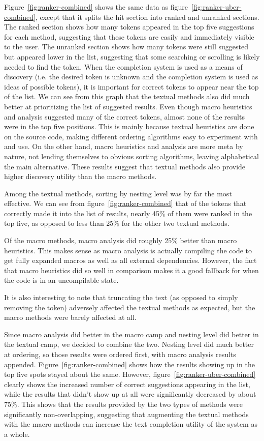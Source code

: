 \documentclass[ms,electronic,twosidetoc,letterpaper,chaptercenter,parttop,lol,lof,lot]{byumsphd}
\begin{document}
Figure~\ref{fig:ranker-combined} shows the same data as figure~\ref{fig:ranker-uber-combined}, except that it splits the hit section into ranked and unranked sections.
The ranked section shows how many tokens appeared in the top five suggestions for each method, suggesting that these tokens are easily and immediately visible to the user.
The unranked section shows how many tokens were still suggested but appeared lower in the list, suggesting that some searching or scrolling is likely needed to find the token.
When the completion system is used as a means of discovery (i.e. the desired token is unknown and the completion system is used as ideas of possible tokens), it is important for correct tokens to appear near the top of the list.
We can see from this graph that the textual methods also did much better at prioritizing the list of suggested results.
Even though macro heuristics and analysis suggested many of the correct tokens, almost none of the results were in the top five positions.
This is mainly because textual heuristics are done on the source code, making different ordering algorithms easy to experiment with and use.
On the other hand, macro heuristics and analysis are more meta by nature, not lending themselves to obvious sorting algorithms, leaving alphabetical the main alternative.
These results suggest that textual methods also provide higher discovery utility than the macro methods.

Among the textual methods, sorting by nesting level was by far the most effective.
We can see from figure~\ref{fig:ranker-combined} that of the tokens that correctly made it into the list of results, nearly 45\% of them were ranked in the top five, as opposed to less than 25\% for the other two textual methods.

Of the macro methods, macro analysis did roughly 25\% better than macro heuristics.
This makes sense as macro analysis is actually compiling the code to get fully expanded macros as well as all external dependencies.
However, the fact that macro heuristics did so well in comparison makes it a good fallback for when the code is in an uncompilable state.

It is also interesting to note that truncating the text (as opposed to simply removing the token) adversely affected the textual methods as expected, but the macro methods were barely affected at all.

Since macro analysis did better in the macro camp and nesting level did better in the textual camp, we decided to combine the two.
Nesting level did much better at ordering, so those results were ordered first, with macro analysis results appended.
Figure~\ref{fig:ranker-combined} shows how the results showing up in the top five spots stayed about the same.
However, figure~\ref{fig:ranker-uber-combined} clearly shows the increased number of correct suggestions appearing in the list, while the results that didn't show up at all were significantly decreased by about 75\%.
This shows that the results provided by the two types of methods were significantly non-overlapping, suggesting that augmenting the textual methods with the macro methods can increase the text completion utility of the system as a whole. 
\end{document}
